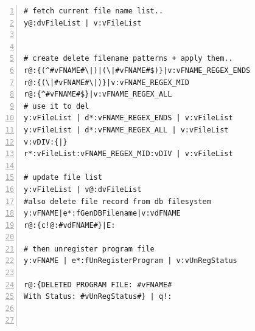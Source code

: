 {\begin{tcolorbox}[teaterminalstyle, title=TEA Program: TOS v1.1.0 Complete Source-Code, breakable]
\begin{lstlisting}[language=TEA,breaklines=true,numbers=left]
# fetch current file name list..
y@:dvFileList | v:vFileList


# create delete filename patterns + apply them..
r@:{(^#vFNAME#\|)|(\|#vFNAME#$)}|v:vFNAME_REGEX_ENDS
r@:{(\|#vFNAME#\|)}|v:vFNAME_REGEX_MID
r@:{^#vFNAME#$}|v:vFNAME_REGEX_ALL
# use it to del
y:vFileList | d*:vFNAME_REGEX_ENDS | v:vFileList
y:vFileList | d*:vFNAME_REGEX_ALL | v:vFileList
v:vDIV:{|}
r*:vFileList:vFNAME_REGEX_MID:vDIV | v:vFileList

# update file list 
y:vFileList | v@:dvFileList 
#also delete file record from db filesystem
y:vFNAME|e*:fGenDBFilename|v:vdFNAME
r@:{c!@:#vdFNAME#}|E:

# then unregister program file
y:vFNAME | e*:fUnRegisterProgram | v:vUnRegStatus

r@:{DELETED PROGRAM FILE: #vFNAME#
With Status: #vUnRegStatus#} | q!:



\end{lstlisting}
\end{tcolorbox}}
